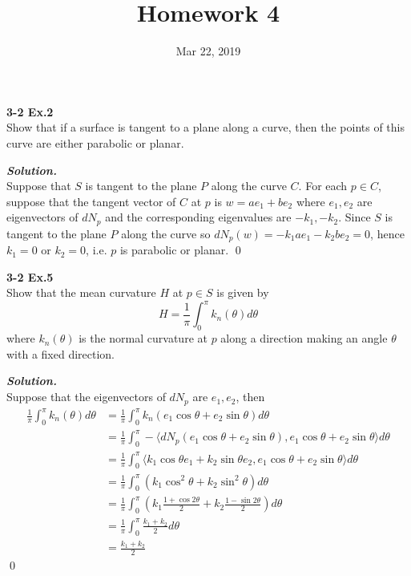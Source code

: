 \documentclass{article}
\begin{document}
\title{Homework 4}
\date{Mar 22, 2019}
\maketitle

\setlength\parindent{0em}   %
\setlength\parskip{1.0\baselineskip} %

\par
\textbf{3-2 Ex.2}\\
Show that if a surface is tangent to a plane along a curve, then
the points of this curve are either parabolic or planar.

\par
\textbf{\textit{Solution.}}\\
Suppose that $S$ is tangent to the plane $P$ along the curve $C$.
For each $p \in C$, suppose that the tangent vector of $C$ at $p$
is $w=ae_1+be_2$ where $e_1, e_2$ are eigenvectors of $dN_p$ and
the corresponding eigenvalues are $-k_1, -k_2$.
Since $S$ is tangent to the plane $P$ along the curve so
$dN_p(w)=-k_1ae_1-k_2be_2=0$, hence $k_1=0$ or $k_2=0$, i.e. $p$
is parabolic or planar. \qed

\par
\textbf{3-2 Ex.5}\\
Show that the mean curvature $H$ at $p \in S$ is given by
$$
    H = \frac{1}{\pi} \int_0^\pi k_n(\theta)d\theta
$$
where $k_n(\theta)$ is the normal curvature at $p$ along a direction
making an angle $\theta$ with a fixed direction.

\par
\textbf{\textit{Solution.}}\\
Suppose that the eigenvectors of $dN_p$ are $e_1,e_2$, then
$$
\begin{aligned}
    \frac{1}{\pi}\int_0^{\pi}k_n(\theta)d\theta
    &= \frac{1}{\pi}\int_0^{\pi}k_n(e_1\cos \theta + e_2 \sin \theta)d\theta\\
    &= \frac{1}{\pi}\int_0^{\pi} -\langle dN_p(e_1\cos \theta + e_2 \sin \theta), e_1\cos \theta+e_2\sin \theta\rangle d\theta\\
    &= \frac{1}{\pi}\int_0^{\pi} \langle k_1\cos \theta e_1 + k_2 \sin \theta e_2, e_1\cos \theta+e_2\sin \theta\rangle d\theta\\
    &= \frac{1}{\pi}\int_0^{\pi} (k_1 \cos^2 \theta + k_2 \sin^2 \theta) d\theta\\
    &= \frac{1}{\pi}\int_0^{\pi} (k_1 \frac{1 + \cos 2\theta}{2} + k_2 \frac{1 - \sin 2\theta}{2}) d\theta\\
    &= \frac{1}{\pi}\int_0^{\pi} \frac{k_1 + k_2}{2} d\theta\\
    &= \frac{k_1+k_2}{2}
\end{aligned}
$$
\qed
\end{document}
